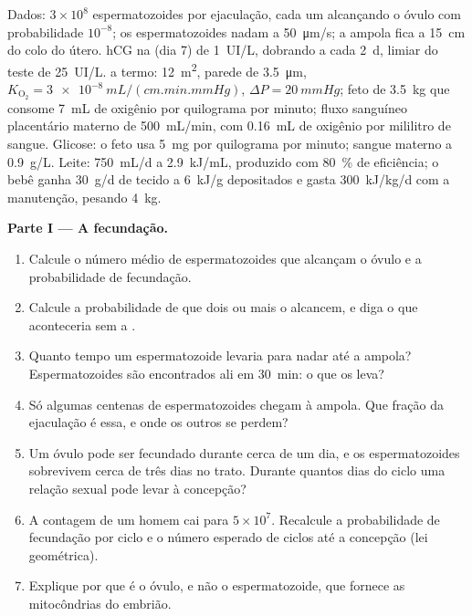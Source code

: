 \begin{problem}
\label{pb:b2:mammal-reproduction:1}
Dados: $3\times 10^{8}$ espermatozoides por ejaculação, cada um
alcançando o óvulo com probabilidade $10^{-8}$; os espermatozoides
nadam a \qty{50}{\micro m/s}; a ampola fica a \qty{15}{cm} do colo do
útero. hCG na  (dia 7) de
\qty{1}{UI/L}, dobrando a cada \qty{2}{d}, limiar do teste de
\qty{25}{UI/L}.  a termo: \qty{12}{m^2}, parede de
\qty{3.5}{\micro m}, $K_{\mathrm{O_2}} = \qty{3e-8}{mL/(cm.min.mmHg)}$,
$\Delta P = \qty{20}{mmHg}$; feto de \qty{3.5}{kg} que consome
\qty{7}{mL} de oxigênio por quilograma por minuto; fluxo sanguíneo
placentário materno de \qty{500}{mL/min}, com \qty{0.16}{mL} de
oxigênio por mililitro de sangue. Glicose: o feto usa \qty{5}{mg} por
quilograma por minuto; sangue materno a \qty{0.9}{g/L}. Leite:
\qty{750}{mL/d} a \qty{2.9}{kJ/mL}, produzido com \qty{80}{\%} de
eficiência; o bebê ganha \qty{30}{g/d} de tecido a \qty{6}{kJ/g}
depositados e gasta \qty{300}{kJ/kg/d} com a manutenção, pesando
\qty{4}{kg}.

\medskip
\noindent\textbf{Parte I --- A fecundação.}
\begin{enumerate}
  \item Calcule o número médio de espermatozoides que alcançam o óvulo
        e a probabilidade de fecundação.
  \item Calcule a probabilidade de que dois ou mais o alcancem, e diga
        o que aconteceria sem a .
  \item Quanto tempo um espermatozoide levaria para nadar até a ampola?
        Espermatozoides são encontrados ali em \qty{30}{min}: o que os
        leva?
  \item Só algumas centenas de espermatozoides chegam à ampola. Que
        fração da ejaculação é essa, e onde os outros se perdem?
  \item Um óvulo pode ser fecundado durante cerca de um dia, e os
        espermatozoides sobrevivem cerca de três dias no trato. Durante
        quantos dias do ciclo uma relação sexual pode levar à
        concepção?
  \item A contagem de um homem cai para $5\times 10^{7}$. Recalcule a
        probabilidade de fecundação por ciclo e o número esperado de
        ciclos até a concepção (lei geométrica).
  \item Explique por que é o óvulo, e não o espermatozoide, que fornece
        as mitocôndrias do embrião.
\end{enumerate}


\end{problem}
